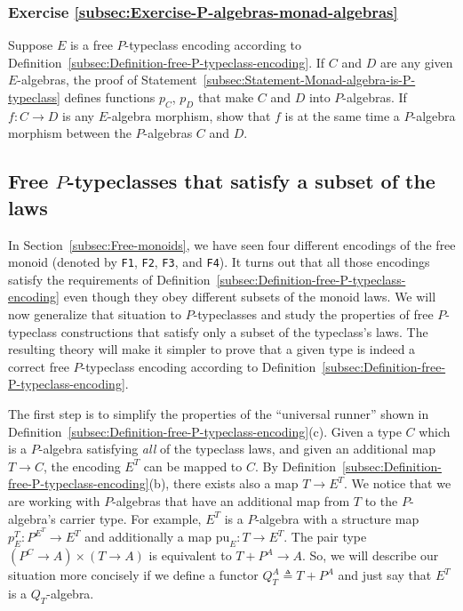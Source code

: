 \subsubsection{Exercise \label{subsec:Exercise-P-algebras-monad-algebras}\ref{subsec:Exercise-P-algebras-monad-algebras}}

Suppose $E$ is a free $P$-typeclass encoding according to Definition~\ref{subsec:Definition-free-P-typeclass-encoding}.
If $C$ and $D$ are any given $E$-algebras, the proof of Statement~\ref{subsec:Statement-Monad-algebra-is-P-typeclass}
defines functions $p_{C}$, $p_{D}$ that make $C$ and $D$ into
$P$-algebras. If $f:C\rightarrow D$ is any $E$-algebra morphism,
show that $f$ is at the same time a $P$-algebra morphism between
the $P$-algebras $C$ and $D$.

\subsection{Free $P$-typeclasses that satisfy a subset of the laws\label{subsec:Free--typeclasses-that-satisfy-laws}}

In Section~\ref{subsec:Free-monoids}, we have seen four different
encodings of the free monoid (denoted by \lstinline!F1!,
\lstinline!F2!, \lstinline!F3!,
and \lstinline!F4!). It
turns out that all those encodings satisfy the requirements of Definition~\ref{subsec:Definition-free-P-typeclass-encoding}
even though they obey different subsets of the monoid laws. We will
now generalize that situation to $P$-typeclasses and study the properties
of free $P$-typeclass constructions that satisfy only a subset of
the typeclass\textsf{'}s laws. The resulting theory will make it simpler to
prove that a given type is indeed a correct free $P$-typeclass encoding
according to Definition~\ref{subsec:Definition-free-P-typeclass-encoding}.

The first step is to simplify the properties of the \textsf{``}universal runner\textsf{''}
shown in Definition~\ref{subsec:Definition-free-P-typeclass-encoding}(c).
Given a type $C$ which is a $P$-algebra satisfying \emph{all} of
the typeclass laws, and given an additional map $T\rightarrow C$,
the encoding $E^{T}$ can be mapped to $C$. By Definition~\ref{subsec:Definition-free-P-typeclass-encoding}(b),
there exists also a map $T\rightarrow E^{T}$. We notice that we are
working with $P$-algebras that have an additional map from $T$ to
the $P$-algebra\textsf{'}s carrier type. For example, $E^{T}$ is a $P$-algebra
with a structure map $p_{E}^{T}:P^{E^{T}}\rightarrow E^{T}$ and additionally
a map $\text{pu}_{E}:T\rightarrow E^{T}$. The pair type $(P^{C}\rightarrow A)\times(T\rightarrow A)$
is equivalent to $T+P^{A}\rightarrow A$. So, we will describe our
situation more concisely if we define a functor $Q_{T}^{A}\triangleq T+P^{A}$
and just say that $E^{T}$ is a $Q_{T}$-algebra.

